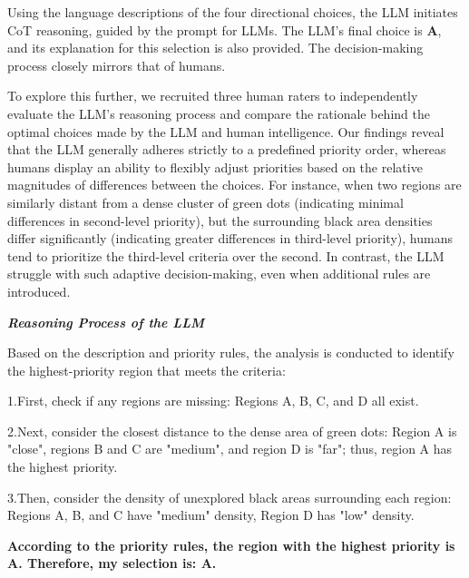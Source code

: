 Using the language descriptions of the four directional choices, the LLM initiates CoT reasoning, guided by the prompt for LLMs. The LLM's final choice is \textbf{A}, and its explanation for this selection is also provided. The decision-making process closely mirrors that of humans. 

To explore this further, we recruited three human raters to independently evaluate the LLM's reasoning process and compare the rationale behind the optimal choices made by the LLM and human intelligence. Our findings reveal that the LLM generally adheres strictly to a predefined priority order, whereas humans display an ability to flexibly adjust priorities based on the relative magnitudes of differences between the choices. For instance, when two regions are similarly distant from a dense cluster of green dots (indicating minimal differences in second-level priority), but the surrounding black area densities differ significantly (indicating greater differences in third-level priority), humans tend to prioritize the third-level criteria over the second. In contrast, the LLM struggle with such adaptive decision-making, even when additional rules are introduced.

\begin{center}
\begin{minipage}{\linewidth}
\begin{shaded}
\textit{\textbf{Reasoning Process of the LLM}}

Based on the description and priority rules, the analysis is conducted to identify the highest-priority region that meets the criteria:

1.First, check if any regions are missing:
Regions A, B, C, and D all exist.

2.Next, consider the closest distance to the dense area of green dots:
Region A is "close", regions B and C are "medium", and region D is "far"; thus, region A has the highest priority.

3.Then, consider the density of unexplored black areas surrounding each region:
Regions A, B, and C have "medium" density, Region D has "low" density.

\textbf{According to the priority rules, the region with the highest priority is A. Therefore, my selection is: A.}
\end{shaded}
\end{minipage}
\end{center}

